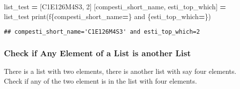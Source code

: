 \documentclass[
]{book}
\newenvironment{Shaded}{\begin{snugshade}}{\end{snugshade}}
\newcommand{\BuiltInTok}[1]{#1}
\newcommand{\DecValTok}[1]{\textcolor[rgb]{0.00,0.00,0.81}{#1}}
\newcommand{\NormalTok}[1]{#1}
\newcommand{\OperatorTok}[1]{\textcolor[rgb]{0.81,0.36,0.00}{\textbf{#1}}}
\newcommand{\SpecialCharTok}[1]{\textcolor[rgb]{0.00,0.00,0.00}{#1}}
\newcommand{\SpecialStringTok}[1]{\textcolor[rgb]{0.31,0.60,0.02}{#1}}
\newcommand{\StringTok}[1]{\textcolor[rgb]{0.31,0.60,0.02}{#1}}
\begin{document}
\begin{Shaded}
\begin{Highlighting}[]
\NormalTok{list\_test }\OperatorTok{=}\NormalTok{ [}\StringTok{\textquotesingle{}C1E126M4S3\textquotesingle{}}\NormalTok{, }\DecValTok{2}\NormalTok{]}
\NormalTok{[compesti\_short\_name, esti\_top\_which] }\OperatorTok{=}\NormalTok{ list\_test}
\BuiltInTok{print}\NormalTok{(}\SpecialStringTok{f\textquotesingle{}}\SpecialCharTok{\{}\NormalTok{compesti\_short\_name}\OperatorTok{=}\SpecialCharTok{\}}\SpecialStringTok{ and }\SpecialCharTok{\{}\NormalTok{esti\_top\_which}\OperatorTok{=}\SpecialCharTok{\}}\SpecialStringTok{\textquotesingle{}}\NormalTok{)}
\end{Highlighting}
\end{Shaded}

\begin{verbatim}
## compesti_short_name='C1E126M4S3' and esti_top_which=2
\end{verbatim}

\hypertarget{check-if-any-element-of-a-list-is-another-list}{%
\subsubsection{Check if Any Element of a List is another List}\label{check-if-any-element-of-a-list-is-another-list}}

There is a list with two elements, there is another list with say four elements. Check if any of the two element is in the list with four elements.
\end{document}
